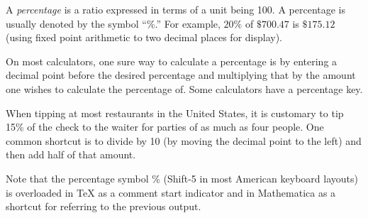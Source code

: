 \documentclass[12pt]{article}
\begin{document}
A {\em percentage} is a ratio expressed in terms of a unit being 100. A percentage is usually denoted by the symbol ``\%.'' For example, $20\%$ of $\$700.47$ is $\$175.12$ (using fixed point arithmetic to two decimal places for display).

On most calculators, one sure way to calculate a percentage is by entering a decimal point before the desired percentage and multiplying that by the amount one wishes to calculate the percentage of. Some calculators have a percentage key.

When tipping at most restaurants in the United States, it is customary to tip 15\% of the check to the waiter for parties of as much as four people. One common shortcut is to divide by 10 (by moving the decimal point to the left) and then add half of that amount.

Note that the percentage symbol \% (Shift-5 in most American keyboard layouts) is overloaded in \TeX{} as a comment start indicator and in Mathematica as a shortcut for referring to the previous output.
\end{document}
